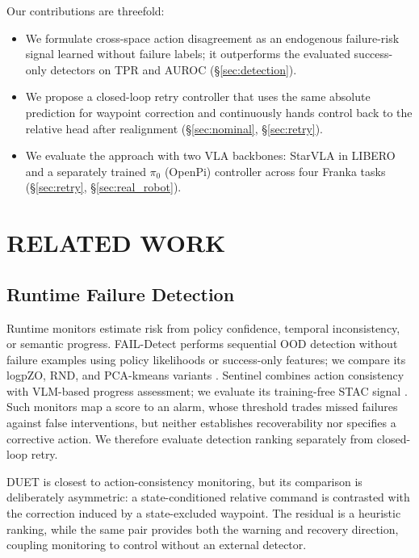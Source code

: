 \documentclass[letterpaper, 10 pt, conference]{ieeeconf}
\begin{document}
Our contributions are threefold:
\begin{itemize}
    \item We formulate cross-space action disagreement as an endogenous failure-risk signal learned without failure labels; it outperforms the evaluated success-only detectors on TPR and AUROC (\S\ref{sec:detection}).
    \item We propose a closed-loop retry controller that uses the same absolute prediction for waypoint correction and continuously hands control back to the relative head after realignment (\S\ref{sec:nominal}, \S\ref{sec:retry}).
    \item We evaluate the approach with two VLA backbones: StarVLA in LIBERO and a separately trained $\pi_0$ (OpenPi) controller across four Franka tasks (\S\ref{sec:retry}, \S\ref{sec:real_robot}).
\end{itemize}

\section{RELATED WORK}

\subsection{Runtime Failure Detection}
Runtime monitors estimate risk from policy confidence, temporal inconsistency, or semantic progress. FAIL-Detect performs sequential OOD detection without failure examples using policy likelihoods or success-only features; we compare its logpZO, RND, and PCA-kmeans variants \cite{faildetect}. Sentinel combines action consistency with VLM-based progress assessment; we evaluate its training-free STAC signal \cite{sentinel}. Such monitors map a score to an alarm, whose threshold trades missed failures against false interventions, but neither establishes recoverability nor specifies a corrective action. We therefore evaluate detection ranking separately from closed-loop retry.

DUET is closest to action-consistency monitoring, but its comparison is deliberately asymmetric: a state-conditioned relative command is contrasted with the correction induced by a state-excluded waypoint. The residual is a heuristic ranking, while the same pair provides both the warning and recovery direction, coupling monitoring to control without an external detector.
\end{document}
